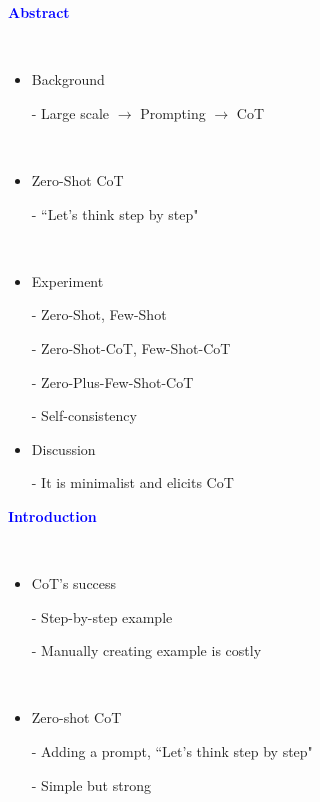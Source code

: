 \documentclass[professionalfont]{beamer}
\begin{document}
\frame{\titlepage}

\begin{frame}
\begin{center}
    { \textbf{\textcolor{blue}{ {\fontsize{12}{14}\selectfont Abstract} }} }
\end{center}
\\[0.5cm]

{\fontsize{10}{14}\selectfont 
\begin{itemize}
    \item Background
    
    - Large scale \( \rightarrow \) Prompting \( \rightarrow \) CoT

    \\[0.3cm]

    \item Zero-Shot CoT

    - ``Let's think step by step"

    \\[0.3cm]

    \item Experiment

    - Zero-Shot, Few-Shot
    
    - Zero-Shot-CoT, Few-Shot-CoT
    
    - Zero-Plus-Few-Shot-CoT

    - Self-consistency

    \item Discussion

    - It is minimalist and elicits CoT
\end{itemize}
}

\end{frame}

\begin{frame}
\begin{center}
    { \textbf{\textcolor{blue}{{\fontsize{12}{14}\selectfont Introduction}}} }
\end{center}
\\[0.5cm]

{\fontsize{10}{14}\selectfont 
\begin{itemize}
    \item CoT's success
    
    - Step-by-step example 

    - Manually creating example is costly

    \\[0.3cm]

    \item Zero-shot CoT

    - Adding a prompt, ``Let’s think step by step"

    - Simple but strong
\end{itemize}
}

\end{frame}
\end{document}
